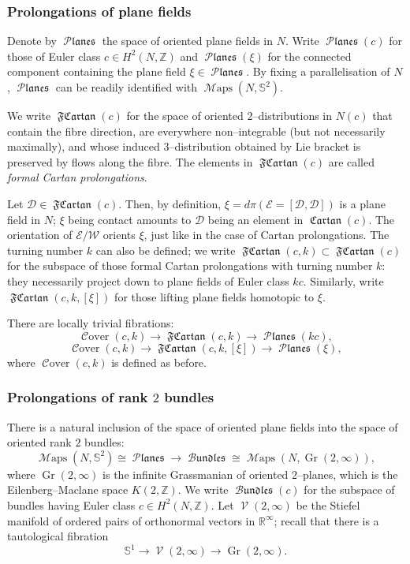 \documentclass[10pt]{amsart}
\newcommand{\SE}{{\mathcal{E}}}
\newcommand{\SD}{{\mathcal{D}}}
\newcommand{\SW}{{\mathcal{W}}}
\newcommand{\Gr}{\operatorname{Gr}}
\newcommand{\V}{\operatorname{\mathcal{V}}}
\newcommand{\Cover}{\operatorname{\mathcal{C}over}}
\newcommand{\Maps}{\operatorname{\mathcal{M}aps}}
\newcommand{\Cartan}{\operatorname{\mathfrak{Cartan}}}
\newcommand{\FCartan}{\operatorname{\mathfrak{FCartan}}}
\newcommand{\Planes}{\operatorname{\mathcal{P}\mathfrak{lanes}}}
\newcommand{\Bundles}{\operatorname{\mathcal{B}\mathfrak{undles}}}
\newcommand{\R}{{\mathbb{R}}}
\newcommand{\Z}{{\mathbb{Z}}}
\newcommand{\NS}{{\mathbb{S}}}
\theoremstyle{definition}
\begin{document}
\subsubsection{Prolongations of plane fields}

Denote by $\Planes$ the space of oriented plane fields in $N$. Write $\Planes(c)$ for those of Euler class $c \in H^2(N, \Z)$ and $\Planes(\xi)$ for the connected component containing the plane field $\xi \in \Planes$. By fixing a parallelisation of $N$, $\Planes$ can be readily identified with $\Maps(N, \mathbb{S}^2)$.

We write $\FCartan(c)$ for the space of oriented $2$--distributions in $N(c)$ that contain the fibre direction, are everywhere non--integrable (but not necessarily maximally), and whose induced $3$--distribution obtained by Lie bracket is preserved by flows along the fibre. The elements in $\FCartan(c)$ are called \textsl{formal Cartan prolongations}.

Let $\SD \in \FCartan(c)$. Then, by definition, $\xi = d\pi(\SE = [\SD,\SD])$ is a plane field in $N$; $\xi$ being contact amounts to $\SD$ being an element in $\Cartan(c)$. The orientation of $\SE/\SW$ orients $\xi$, just like in the case of Cartan prolongations. The turning number $k$ can also be defined; we write $\FCartan(c,k) \subset \FCartan(c)$ for the subspace of those formal Cartan prolongations with turning number $k$: they necessarily project down to plane fields of Euler class $kc$. Similarly, write $\FCartan(c,k,[\xi])$ for those lifting plane fields homotopic to $\xi$. 

There are locally trivial fibrations:
\[ \Cover(c,k) \longrightarrow \FCartan(c,k) \longrightarrow \Planes(kc), \]
\[ \Cover(c,k) \longrightarrow \FCartan(c,k,[\xi]) \longrightarrow \Planes(\xi), \]
where $\Cover(c,k)$ is defined as before.


\subsubsection{Prolongations of rank $2$ bundles}

There is a natural inclusion of the space of oriented plane fields into the space of oriented rank $2$ bundles:
\[ \Maps(N,\NS^2) \cong \Planes \to \Bundles \cong \Maps(N,\Gr(2,\infty)), \]
where $\Gr(2,\infty)$ is the infinite Grassmanian of oriented $2$--planes, which is the Eilenberg--Maclane space $K(2,\mathbb{Z})$. We write $\Bundles(c)$ for the subspace of bundles having Euler class $c \in H^2(N,\Z)$. Let $\V(2,\infty)$ be the Stiefel manifold of ordered pairs of orthonormal vectors in $\R^\infty$; recall that there is a tautological fibration 
\[ \NS^1 \to \V(2,\infty) \to \Gr(2,\infty). \]
\end{document}
